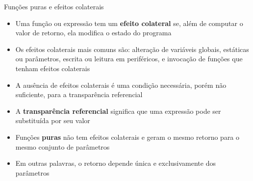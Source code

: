 \begin{frame}[fragile]{Funções puras e efeitos colaterais}

    \begin{itemize}
        \item Uma função ou expressão tem um \textbf{efeito colateral} se, além de computar o
            valor de retorno, ela modifica o estado do programa

        \item Os efeitos colaterais mais comuns são: alteração de variáveis globais, estáticas ou
            parâmetros, escrita ou leitura em periféricos, e invocação de funções que tenham
            efeitos colaterais

        \item A ausência de efeitos colaterais é uma condição necessária, porém não suficiente,
            para a transparência referencial

        \item A \textbf{transparência referencial} significa que uma expressão pode ser substituída
            por seu valor

        \item Funções \textbf{puras} não tem efeitos colaterais e geram o mesmo retorno para o mesmo conjunto de parâmetros

        \item Em outras palavras, o retorno depende única e exclusivamente dos parâmetros
            
    \end{itemize}

\end{frame}

